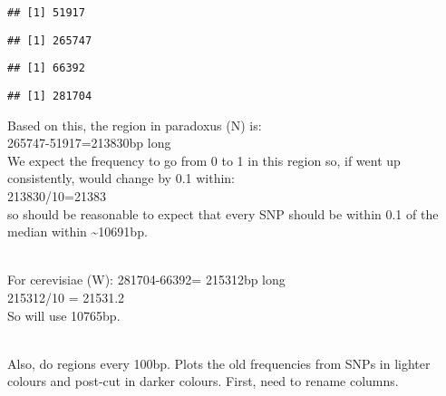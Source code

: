 \documentclass[
]{article}
\newenvironment{Shaded}{\begin{snugshade}}{\end{snugshade}}
\newcommand{\FunctionTok}[1]{\textcolor[rgb]{0.13,0.29,0.53}{\textbf{#1}}}
\newcommand{\NormalTok}[1]{#1}
\newcommand{\SpecialCharTok}[1]{\textcolor[rgb]{0.81,0.36,0.00}{\textbf{#1}}}
\begin{document}
\begin{Shaded}
\end{Shaded}

\begin{verbatim}
## [1] 51917
\end{verbatim}

\begin{Shaded}
\end{Shaded}

\begin{verbatim}
## [1] 265747
\end{verbatim}

\begin{Shaded}
\end{Shaded}

\begin{verbatim}
## [1] 66392
\end{verbatim}

\begin{Shaded}
\end{Shaded}

\begin{verbatim}
## [1] 281704
\end{verbatim}

Based on this, the region in paradoxus (N) is:\\
265747-51917=213830bp long\\
We expect the frequency to go from 0 to 1 in this region so, if went up
consistently, would change by 0.1 within:\\
213830/10=21383\\
so should be reasonable to expect that every SNP should be within 0.1 of
the median within \textasciitilde10691bp.\\
\strut \\
For cerevisiae (W): 281704-66392= 215312bp long\\
215312/10 = 21531.2\\
So will use 10765bp.\\
\strut \\
Also, do regions every 100bp. Plots the old frequencies from SNPs in
lighter colours and post-cut in darker colours. First, need to rename
columns.
\end{document}
